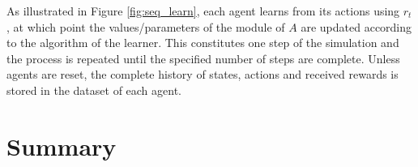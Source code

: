 %

As illustrated in Figure \ref{fig:seq_learn}, each agent learns from its
actions using $r_t$, at which point the values/parameters of the module of $A$
are updated according to the algorithm of the learner. This constitutes one
step of the simulation and the process is repeated until the specified number
of steps are complete.  Unless agents are reset, the complete history of
states, actions and received rewards is stored in the dataset of each agent.

\section{Summary}
